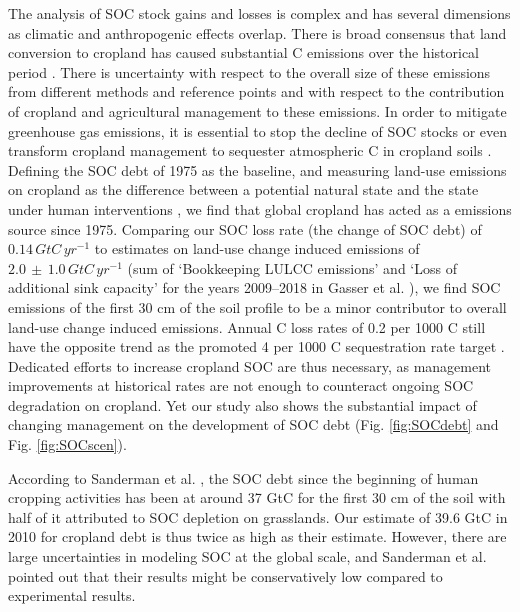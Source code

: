 \documentclass[gc, manuscript]{copernicus}
\begin{document}
The analysis of SOC stock gains and losses is complex and has several dimensions as climatic and anthropogenic effects overlap. There is broad consensus that land conversion to cropland has caused substantial C emissions over the historical period \citep[e.g.][]{frielingstein_glob_carbon_2020}. There is uncertainty with respect to the overall size of these emissions from different methods and reference points and with respect to the contribution of cropland and agricultural management to these emissions. In order to mitigate greenhouse gas emissions, it is essential to stop the decline of SOC stocks or even transform cropland management to sequester atmospheric C in cropland soils \citep{minasny_soil_2017}. Defining the SOC debt of 1975 as the baseline, and measuring land-use emissions on cropland as the difference between a potential natural state and the state under human interventions \citep[see][]{pugh_simulated_2015}, we find that global cropland has acted as a emissions source since 1975.
Comparing our SOC loss rate (the change of SOC debt) of \(0.14\,\unit{GtC\,yr^{-1}}\) to estimates on land-use change induced emissions of \(2.0\,\pm\,1.0\,\unit{GtC\,yr^{-1}}\) (sum of `Bookkeeping LULCC emissions' and `Loss of additional sink capacity' for the years 2009--2018 in Gasser et al. \citeyearpar{gasser_historical_2020}), we find SOC emissions of the first 30 cm of the soil profile to be a minor contributor to overall land-use change induced emissions.
Annual C loss rates of 0.2 per 1000 C still have the opposite trend as the promoted 4 per 1000 C sequestration rate target \citep{minasny_soil_2017}. Dedicated efforts to increase cropland SOC are thus necessary, as management improvements at historical rates are not enough to counteract ongoing SOC degradation on cropland. Yet our study also shows the substantial impact of changing management on the development of SOC debt (Fig. \ref{fig:SOCdebt} and Fig. \ref{fig:SOCscen}).

According to Sanderman et al. \citeyearpar{sanderman_soil_2017}, the SOC debt since the beginning of human cropping activities has been at around 37 GtC for the first 30 cm of the soil with half of it attributed to SOC depletion on grasslands. Our estimate of 39.6 GtC in 2010 for cropland debt is thus twice as high as their estimate. However, there are large uncertainties in modeling SOC at the global scale, and Sanderman et al. \citeyearpar{sanderman_soil_2017} pointed out that their results might be conservatively low compared to experimental results.
\end{document}
